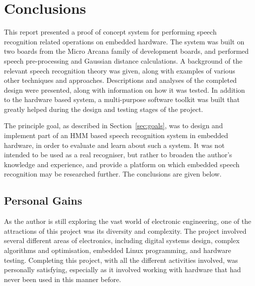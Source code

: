 \chapter{Conclusions} %
\label{cha:conclusions_and_future_work}


This report presented a proof of concept system for performing speech recognition related operations on embedded hardware.  The system was built on two boards from the Micro Arcana family of development boards, and performed speech pre-processing and Gaussian distance calculations.  A background of the relevant speech recognition theory was given, along with examples of various other techniques and approaches.  Descriptions and analyses of the completed design were presented, along with information on how it was tested.  In addition to the hardware based system, a multi-purpose software toolkit was built that greatly helped during the design and testing stages of the project.

The principle goal, as described in Section~\ref{sec:goals}, was to design and implement part of an HMM based speech recognition system in embedded hardware, in order to evaluate and learn about such a system.  It was not intended to be used as a real recogniser, but rather to broaden the author's knowledge and experience, and provide a platform on which embedded speech recognition may be researched further.  The conclusions are given below.


\section{Personal Gains} %
\label{sec:personal_gains}
	As the author is still exploring the vast world of electronic engineering, one of the attractions of this project was its diversity and complexity.  The project involved several different areas of electronics, including digital systems design, complex algorithms and optimisation, embedded Linux programming, and hardware testing.  Completing this project, with all the different activities involved, was personally satisfying, especially as it involved working with hardware that had never been used in this manner before.


